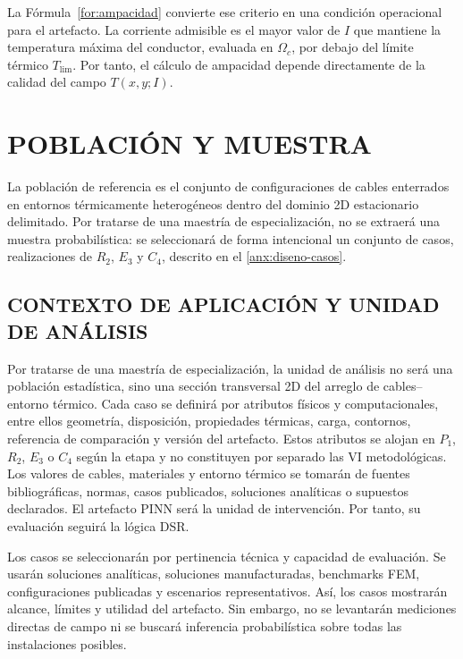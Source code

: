 \documentclass[11pt,a4paper,oneside]{report}
\begin{document}
La Fórmula~\ref{for:ampacidad} convierte ese criterio en una condición operacional para el artefacto. La corriente admisible es el mayor valor de $I$ que mantiene la temperatura máxima del conductor, evaluada en $\Omega_c$, por debajo del límite térmico $T_{\mathrm{lim}}$. Por tanto, el cálculo de ampacidad depende directamente de la calidad del campo $T(x,y;I)$.

\section{POBLACIÓN Y MUESTRA}

La población de referencia es el conjunto de configuraciones de cables enterrados en entornos térmicamente heterogéneos dentro del dominio 2D estacionario delimitado. Por tratarse de una maestría de especialización, no se extraerá una muestra probabilística: se seleccionará de forma intencional un conjunto de casos, realizaciones de $R_2$, $E_3$ y $C_4$, descrito en el \ref{anx:diseno-casos}.

\subsection{CONTEXTO DE APLICACIÓN Y UNIDAD DE ANÁLISIS}
\label{subsec:unidad-analisis}

Por tratarse de una maestría de especialización, la unidad de análisis no será una población estadística, sino una sección transversal 2D del arreglo de cables--entorno térmico. Cada caso se definirá por atributos físicos y computacionales, entre ellos geometría, disposición, propiedades térmicas, carga, contornos, referencia de comparación y versión del artefacto. Estos atributos se alojan en $P_1$, $R_2$, $E_3$ o $C_4$ según la etapa y no constituyen por separado las VI metodológicas. Los valores de cables, materiales y entorno térmico se tomarán de fuentes bibliográficas, normas, casos publicados, soluciones analíticas o supuestos declarados. El artefacto PINN será la unidad de intervención. Por tanto, su evaluación seguirá la lógica DSR.

Los casos se seleccionarán por pertinencia técnica y capacidad de evaluación. Se usarán soluciones analíticas, soluciones manufacturadas, benchmarks FEM, configuraciones publicadas y escenarios representativos. Así, los casos mostrarán alcance, límites y utilidad del artefacto. Sin embargo, no se levantarán mediciones directas de campo ni se buscará inferencia probabilística sobre todas las instalaciones posibles.
\end{document}
